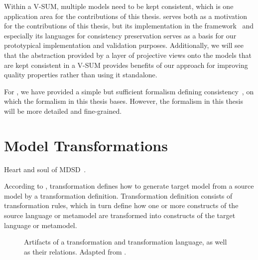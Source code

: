 Within a V-SUM, multiple models need to be kept consistent, which is one application area for the contributions of this thesis.
\vitruv serves both as a motivation for the contributions of this thesis, but its implementation in the \vitruv framework~\cite{vitruvFrameworkGithub} and especially its languages for consistency preservation serves as a basis for our prototypical implementation and validation purposes.
Additionally, we will see that the abstraction provided by a layer of projective views onto the models that are kept consistent in a V-SUM provides benefits of our approach for improving quality properties rather than using it standalone.

For \vitruv, we have provided a simple but sufficient formalism defining consistency~\cite{klare2020Vitruv-JSS}, on which the formalism in this thesis bases.
However, the formalism in this thesis will be more detailed and fine-grained.



\section{Model Transformations}
\label{chap:foundations:transformations}

Heart and soul of \gls{MDSD}~\cite{sendall2003modelTransformation-Software}.

According to \textcite{kleppe2003mdaExplained-Book}, transformation defines how to generate target model from a source model by a transformation definition.
Transformation definition consists of transformation rules, which in turn define how one or more constructs of the source language or metamodel are transformed into constructs of the target language or metamodel.

\begin{figure}
    \centering
    
    \caption[Transformation artifacts and their relations]{Artifacts of a transformation and transformation language, as well as their relations. Adapted from \cite[Fig.~9-5]{kleppe2003mdaExplained-Book}.}
    \label{fig:foundations:transformation}
\end{figure}

